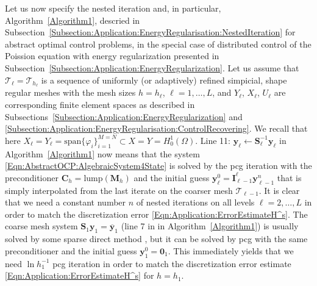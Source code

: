 \documentclass{article}
\numberwithin{equation}{section}
\begin{document}
Let us now specify the nested iteration and, in particular,
Algorithm~\ref{Algorithm1}, descried in
Subsection~\ref{Subsection:Application:EnergyRegularisation:NestedIteration}
for abstract optimal control problems, in the special case of distributed
control of the Poission equation with energy regularization 
presented in Subsection~\ref{Subsection:Application:EnergyRegularization}.
Let us assume that $\mathcal{T}_\ell = \mathcal{T}_{h_\ell}$ is a sequence 
of uniformly (or adaptively) refined simpicial, shape regular meshes with the 
mesh sizes $h = h_\ell$, $\ell = 1,\ldots,L$, and $Y_\ell$, $X_\ell$, $U_\ell$
are corresponding finite element spaces as described in
Subsections~\ref{Subsection:Application:EnergyRegularization} and
\ref{Subsection:Application:EnergyRegularisation:ControlRecovering}. We
recall that here $X_\ell = Y_\ell = \mbox{span} \{ \varphi_i \}_{i=1}^{M=N}
\subset X=Y = H^1_0(\Omega)$.
Line 11: $\mathbf{y}_\ell \leftarrow \mathbf{S}_\ell^{-1}\mathbf{y}_\ell$ 
in Algorithm~\ref{Algorithm1} now means that the system
\eqref{Eqn:AbstractOCP:AlgebraicSystem4State} is solved by the pcg
iteration with the preconditioner $\mathbf{C}_h = \mbox{lump}(\mathbf{M}_h)$
and the initial guess
$\mathbf{y}_\ell^0 = \mathbf{I}_{\ell-1}^\ell \mathbf{y}_{\ell-1}^n$ 
that is simply interpolated from the last iterate on the coarser mesh
$\mathcal{T}_{\ell-1}$. It is clear that we need a constant number $n$ of
nested iterations on all levels $\ell = 2,\ldots,L$ in order to match the
discretization error \eqref{Eqn:Application:ErrorEstimateH^s}. The coarse
mesh system $\mathbf{S}_1 \mathbf{y}_1 = \overline{\mathbf{y}}_1$
(line 7 in in Algorithm~\ref{Algorithm1}) is usually solved by some sparse
direct method \cite{Davis2006Book}, but it can be solved by pcg with the
same preconditioner and the initial guess $\mathbf{y}_1^0 = \mathbf{0}_1$. 
This immediately yields that we need $\ln h_1^{-1}$ pcg iteration in order
to match the discretization error estimate
\eqref{Eqn:Application:ErrorEstimateH^s} for $h=h_1$.
\end{document}
